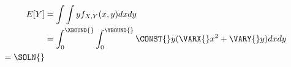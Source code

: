 \begin{equation*}
\begin{split}
E[Y] &= \int \int y f_{X,Y} (x,y) dx dy \\ &= \int_{0}^{\XBOUND{}} \int_{0}^{\YBOUND{}} \CONST{}y(\VARX{} x^2 +\VARY{} y) dx dy \\
=\SOLN{}
\end{split}
\end{equation*}